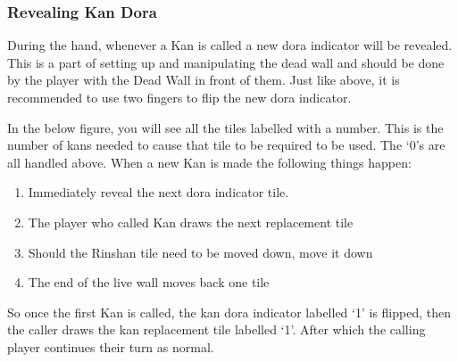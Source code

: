 

\subsubsection{Revealing Kan Dora}\label{core:sssec:revealing-kan-dora}

During the hand, whenever a Kan is called  a new dora indicator will be revealed. This is a part of setting up and manipulating the dead wall and should be done by the player with the Dead Wall in front of them. Just like above, it is recommended to use two fingers to flip the new dora indicator.

In the below figure, you will see all the tiles labelled with a number. This is the number of kans needed to cause that tile to be required to be used. The `0's are all handled above. When a new Kan is made the following things happen:

\begin{enumerate}
	\item Immediately reveal the next dora indicator tile.
	\item The player who called Kan draws the next replacement tile
	\item Should the Rinshan tile need to be moved down, move it down
	\item The end of the live wall moves back one tile
\end{enumerate}

So once the first Kan is called, the kan dora indicator labelled `1' is flipped, then the caller draws the kan replacement tile labelled `1'. After which the calling player continues their turn as normal.




